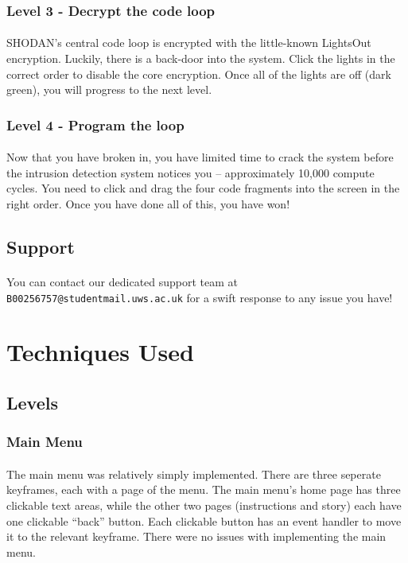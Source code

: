 \documentclass{article}
\begin{document}
\subsubsection {Level 3 - Decrypt the code loop}
\paragraph{}
SHODAN's central code loop is encrypted with the little-known LightsOut encryption. Luckily, there is a back-door into the system. Click the lights in the correct order to disable the core encryption. Once all of the lights are off (dark green), you will progress to the next level.
\subsubsection {Level 4 - Program the loop}
\paragraph{}
Now that you have broken in, you have limited time to crack the system before the intrusion detection system notices you -- approximately 10,000 compute cycles. You need to click and drag the four code fragments into the screen in the right order. Once you have done all of this, you have won!
\subsection {Support}
\paragraph{}
You can contact our dedicated support team at \texttt{B00256757@studentmail.uws.ac.uk} for a swift response to any issue you have!
\section {Techniques Used}
\subsection{Levels}
\subsubsection{Main Menu}
\paragraph{}
The main menu was relatively simply implemented. There are three seperate keyframes, each with a page of the menu. The main menu's home page has three clickable text areas, while the other two pages (instructions and story) each have one clickable ``back'' button. Each clickable button has an event handler to move it to the relevant keyframe. There were no issues with implementing the main menu.
\end{document}
